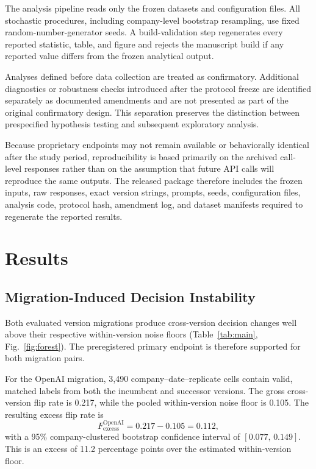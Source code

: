 \documentclass{ieeeaccess}
\begin{document}
The analysis pipeline reads only the frozen datasets and configuration files. All stochastic procedures, including company-level bootstrap resampling, use fixed random-number-generator seeds. A build-validation step regenerates every reported statistic, table, and figure and rejects the manuscript build if any reported value differs from the frozen analytical output.

Analyses defined before data collection are treated as confirmatory. Additional diagnostics or robustness checks introduced after the protocol freeze are identified separately as documented amendments and are not presented as part of the original confirmatory design. This separation preserves the distinction between prespecified hypothesis testing and subsequent exploratory analysis.

Because proprietary endpoints may not remain available or behaviorally identical after the study period, reproducibility is based primarily on the archived call-level responses rather than on the assumption that future API calls will reproduce the same outputs. The released package therefore includes the frozen inputs, raw responses, exact version strings, prompts, seeds, configuration files, analysis code, protocol hash, amendment log, and dataset manifests required to regenerate the reported results.

\section{Results}
\label{sec:results}
\subsection{Migration-Induced Decision Instability}
Both evaluated version migrations produce cross-version decision changes well above their respective within-version noise floors (Table~\ref{tab:main}, Fig.~\ref{fig:forest}). The preregistered primary endpoint is therefore supported for both migration pairs.

For the OpenAI migration, 3{,}490 company--date--replicate cells contain valid, matched labels from both the incumbent and successor versions. The gross cross-version flip rate is 0.217, while the pooled within-version noise floor is 0.105. The resulting excess flip rate is
\begin{equation}
F_{\mathrm{excess}}^{\mathrm{OpenAI}} = 0.217-0.105 = 0.112,
\end{equation}
with a 95\% company-clustered bootstrap confidence interval of $[0.077,\,0.149]$. This is an excess of 11.2 percentage points over the estimated within-version floor.
\end{document}
